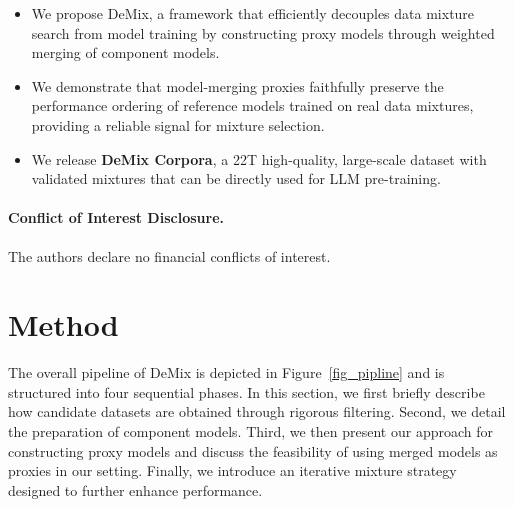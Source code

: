 \documentclass{article}
\theoremstyle{plain}
\theoremstyle{definition}
\theoremstyle{remark}
\newcommand{\comments}[1]{\textcolor{red}{#1}}
\begin{document}
\begin{itemize}
\item We propose DeMix, a framework that efficiently decouples data mixture search from model training by constructing proxy models through weighted merging of component models.
\item We demonstrate that model-merging proxies faithfully preserve the performance ordering of reference models trained on real data mixtures, providing a reliable signal for mixture selection.
\item We release \textbf{DeMix Corpora}, a 22T high-quality, large-scale dataset with validated mixtures that can be directly used for LLM pre-training.
\end{itemize}

\paragraph{Conflict of Interest Disclosure.}
The authors declare no financial conflicts of interest.






\section{Method}

The overall pipeline of DeMix is depicted in Figure~\ref{fig_pipline} and is structured into four sequential phases. In this section, we first briefly describe how candidate datasets are obtained through rigorous filtering. Second, we detail the preparation of component models. Third, we then present our approach for constructing proxy models and discuss the feasibility of using merged models as proxies in our setting. Finally, we introduce an iterative mixture strategy designed to further enhance performance.
\end{document}

